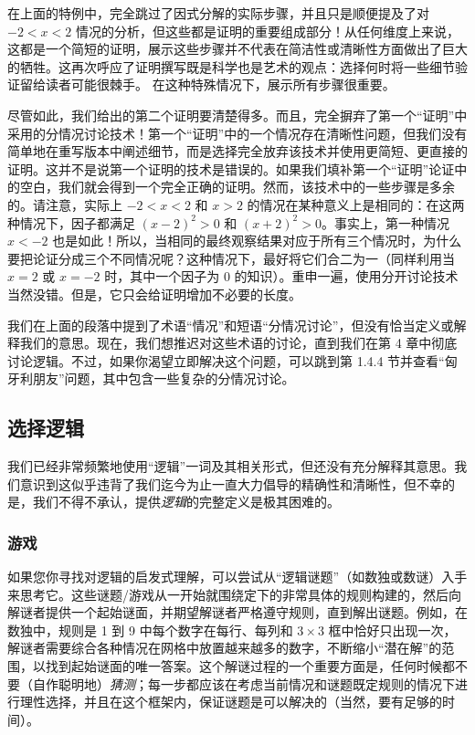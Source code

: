 在上面的特例中，完全跳过了因式分解的实际步骤，并且只是顺便提及了对 $-2 < x < 2$ 情况的分析，但这些都是证明的重要组成部分！从任何维度上来说，这都是一个简短的证明，展示这些步骤并不代表在简洁性或清晰性方面做出了巨大的牺牲。这再次呼应了证明撰写既是科学也是艺术的观点：选择何时将一些细节验证留给读者可能很棘手。 在这种特殊情况下，展示所有步骤很重要。

尽管如此，我们给出的第二个证明要清楚得多。而且，完全摒弃了第一个``证明''中采用的分情况讨论技术！第一个``证明''中的一个情况存在清晰性问题，但我们没有简单地在重写版本中阐述细节，而是选择完全放弃该技术并使用更简短、更直接的证明。这并不是说第一个证明的技术是错误的。如果我们填补第一个``证明''论证中的空白，我们就会得到一个完全正确的证明。然而，该技术中的一些步骤是多余的。请注意，实际上 $-2 < x < 2$ 和 $x > 2$ 的情况在某种意义上是相同的：在这两种情况下，因子都满足 $(x - 2)^2 > 0$ 和 $(x + 2)^2 > 0$。事实上，第一种情况 $x<-2$ 也是如此！所以，当相同的最终观察结果对应于所有三个情况时，为什么要把论证分成三个不同情况呢？这种情况下，最好将它们合二为一（同样利用当 $x = 2$ 或 $x = -2$ 时，其中一个因子为 $0$ 的知识）。重申一遍，使用分开讨论技术当然没错。但是，它只会给证明增加不必要的长度。

我们在上面的段落中提到了术语``情况''和短语``分情况讨论''，但没有恰当定义或解释我们的意思。现在，我们想推迟对这些术语的讨论，直到我们在第 4 章中彻底讨论逻辑。不过，如果你渴望立即解决这个问题，可以跳到第 1.4.4 节并查看``匈牙利朋友''问题，其中包含一些复杂的分情况讨论。

\subsection{选择逻辑}

我们已经非常频繁地使用``逻辑''一词及其相关形式，但还没有充分解释其意思。我们意识到这似乎违背了我们迄今为止一直大力倡导的精确性和清晰性，但不幸的是，我们不得不承认，提供\emph{逻辑}的完整定义是极其困难的。

\subsubsection*{游戏}

如果您你寻找对逻辑的启发式理解，可以尝试从``逻辑谜题''（如数独或数谜）入手来思考它。这些谜题/游戏从一开始就围绕定下的非常具体的规则构建的，然后向解谜者提供一个起始谜面，并期望解谜者严格遵守规则，直到解出谜题。例如，在数独中，规则是 1 到 9 中每个数字在每行、每列和 $3 \times 3$ 框中恰好只出现一次，解谜者需要综合各种情况在网格中放置越来越多的数字，不断缩小``潜在解''的范围，以找到起始谜面的唯一答案。这个解谜过程的一个重要方面是，任何时候都不要（自作聪明地）\emph{猜测}；每一步都应该在考虑当前情况和谜题既定规则的情况下进行理性选择，并且在这个框架内，保证谜题是可以解决的（当然，要有足够的时间）。

